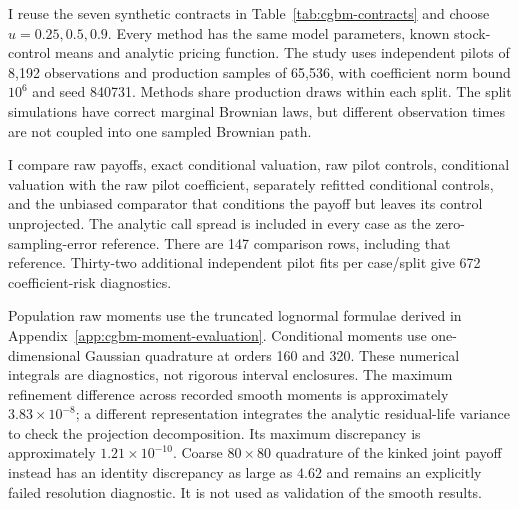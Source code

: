 \documentclass[11pt]{article}
\begin{document}
I reuse the seven synthetic contracts in Table~\ref{tab:cgbm-contracts}
and choose $u=0.25,0.5,0.9$. Every method has the same model parameters,
known stock-control means and analytic pricing function. The study uses
independent pilots of 8,192 observations and production samples of 65,536,
with coefficient norm bound $10^6$ and seed 840731. Methods share production
draws within each split. The split simulations have correct marginal
Brownian laws, but different observation times are not coupled into one
sampled Brownian path.

I compare raw payoffs, exact conditional valuation, raw pilot controls,
conditional valuation with the raw pilot coefficient, separately refitted
conditional controls, and the unbiased comparator that conditions the
payoff but leaves its control unprojected. The analytic call spread is
included in every case as the zero-sampling-error reference. There are
147 comparison rows, including that reference. Thirty-two additional
independent pilot fits per case/split give 672 coefficient-risk diagnostics.

Population raw moments use the truncated lognormal formulae derived in
Appendix~\ref{app:cgbm-moment-evaluation}. Conditional moments use
one-dimensional Gaussian quadrature at orders 160 and 320. These numerical
integrals are diagnostics, not rigorous interval enclosures. The maximum
refinement difference across recorded smooth moments is approximately
$3.83\times10^{-8}$; a different representation integrates the analytic
residual-life variance to check the projection decomposition.
Its maximum discrepancy is approximately $1.21\times10^{-10}$.
Coarse $80\times80$ quadrature of the kinked joint payoff instead has an
identity discrepancy as large as $4.62$ and remains an explicitly failed
resolution diagnostic. It is not used as validation of the smooth results.
\end{document}
